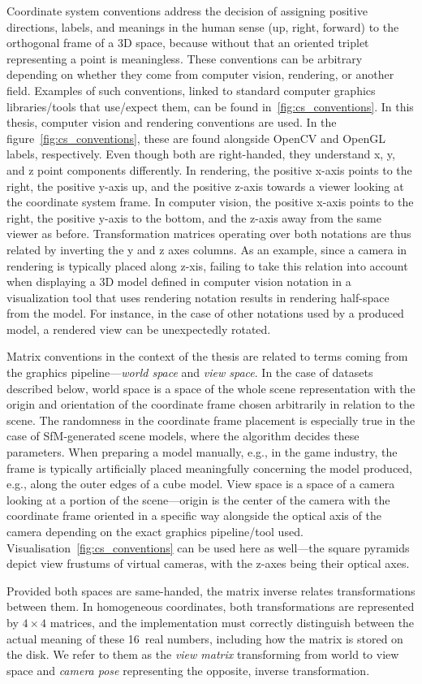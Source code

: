 Coordinate system conventions address the decision of assigning positive directions,
labels, and meanings in the human sense (up, right, forward) to the orthogonal frame of a
3D space, because without that an oriented triplet representing a point is meaningless.
These conventions can be arbitrary depending on whether they come from computer vision,
rendering, or another field. Examples of such conventions, linked to standard computer
graphics libraries/tools that use/expect them, can be found in~\cref{fig:cs_conventions}.
In this thesis, computer vision and rendering conventions are used. In the
figure~\cref{fig:cs_conventions}, these are found alongside OpenCV and OpenGL labels,
respectively. Even though both are right-handed, they understand x, y, and z point
components differently.  In rendering, the positive x-axis points to the right, the
positive y-axis up, and the positive z-axis towards a viewer looking at the coordinate
system frame. In computer vision, the positive x-axis points to the right, the positive
y-axis to the bottom, and the z-axis away from the same viewer as before. Transformation
matrices operating over both notations are thus related by inverting the y and z axes
columns. As an example, since a camera in rendering is typically placed along z-xis,
failing to take this relation into account when displaying a 3D model defined in computer
vision notation in a visualization tool that uses rendering notation results in rendering
half-space  from the model. For instance, in the case of other notations used by
a produced model, a rendered view can be unexpectedly rotated.

Matrix conventions in the context of the thesis are related to terms coming from the
graphics pipeline---\emph{world space} and \emph{view space}. In the case of datasets
described below, world space is a space of the whole scene representation with the origin
and orientation of the coordinate frame chosen arbitrarily in relation to the scene.  The
randomness in the coordinate frame placement is especially true in the case of
SfM-generated scene models, where the algorithm decides these parameters.  When preparing
a model manually, e.g., in the game industry, the frame is typically artificially placed
meaningfully concerning the model produced, e.g., along the outer edges of a cube model.
View space is a space of a camera looking at a portion of the scene---origin is the center
of the camera with the coordinate frame oriented in a specific way alongside the optical
axis of the camera depending on the exact graphics pipeline/tool used.
Visualisation~\cref{fig:cs_conventions} can be used here as well---the square pyramids
depict view frustums of virtual cameras, with the z-axes being their optical axes.

Provided both spaces are same-handed, the matrix inverse relates transformations between
them. In homogeneous coordinates, both transformations are represented by $4\times4$
matrices, and the implementation must correctly distinguish between the actual meaning of
these 16~real numbers, including how the matrix is stored on the disk. We refer to them as
the \emph{view matrix} transforming from world to view space and \emph{camera pose}
representing the opposite, inverse transformation.
